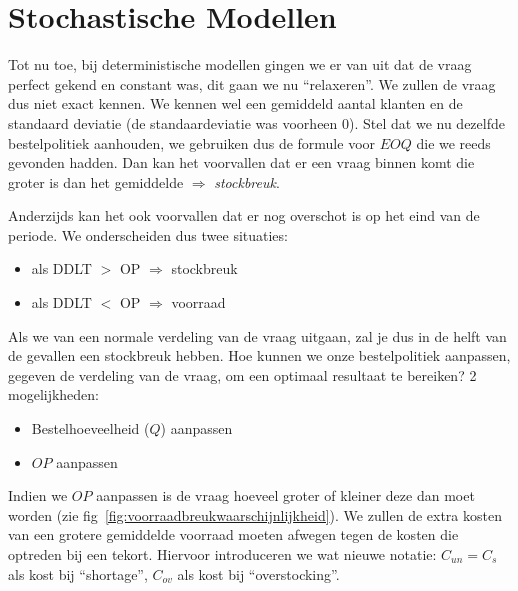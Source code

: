 \section{Stochastische Modellen}
\label{sec:Stochastische Modellen}

Tot nu toe, bij deterministische modellen gingen we er van uit dat de vraag perfect gekend en constant was, dit gaan we nu ``relaxeren''. We zullen de vraag dus niet exact kennen. We kennen wel een gemiddeld aantal klanten en de standaard deviatie (de standaardeviatie was voorheen 0). Stel dat we nu dezelfde bestelpolitiek aanhouden, we gebruiken dus de formule voor $EOQ$ die we reeds gevonden hadden. Dan kan het voorvallen dat er een vraag binnen komt die groter is dan het gemiddelde $\Rightarrow$ \textit{stockbreuk}.

Anderzijds kan het ook voorvallen dat er nog overschot is op het eind van de periode. We onderscheiden dus twee situaties:
\begin{itemize}
    \item als DDLT $>$ OP $\Rightarrow$ stockbreuk
    \item als DDLT $<$ OP $\Rightarrow$ voorraad
\end{itemize}
Als we van een normale verdeling van de vraag uitgaan, zal je dus in de helft van de gevallen een stockbreuk hebben. Hoe kunnen we onze bestelpolitiek aanpassen, gegeven de verdeling van de vraag, om een optimaal resultaat te bereiken? 2 mogelijkheden:
\begin{itemize}
    \item Bestelhoeveelheid ($Q$) aanpassen
    \item $OP$ aanpassen
\end{itemize}

Indien we $OP$ aanpassen is de vraag hoeveel groter of kleiner deze dan moet worden (zie fig~\ref{fig:voorraadbreukwaarschijnlijkheid}). We zullen de extra kosten van een grotere gemiddelde voorraad moeten afwegen tegen de kosten die optreden bij een tekort. Hiervoor introduceren we wat nieuwe notatie: $C_{un} = C_s$ als kost bij ``shortage'', $C_{ov}$ als kost bij ``overstocking''.

